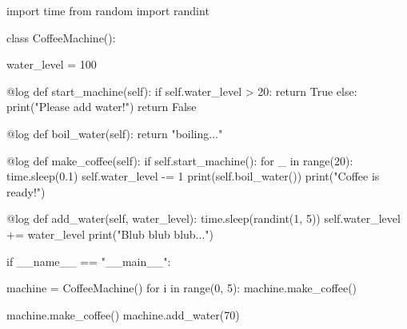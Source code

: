 \documentclass[]{article}
\newenvironment{Shaded}{\begin{snugshade}}{\end{snugshade}}
\newcommand{\AttributeTok}[1]{\textcolor[rgb]{0.16,0.50,0.73}{#1}}
\newcommand{\BuiltInTok}[1]{\textcolor[rgb]{0.50,0.55,0.55}{#1}}
\newcommand{\ControlFlowTok}[1]{\textcolor[rgb]{0.99,0.74,0.29}{#1}}
\newcommand{\DecValTok}[1]{\textcolor[rgb]{0.96,0.45,0.00}{#1}}
\newcommand{\FloatTok}[1]{\textcolor[rgb]{0.96,0.45,0.00}{#1}}
\newcommand{\ImportTok}[1]{\textcolor[rgb]{0.15,0.68,0.38}{#1}}
\newcommand{\KeywordTok}[1]{\textcolor[rgb]{0.81,0.81,0.76}{#1}}
\newcommand{\NormalTok}[1]{\textcolor[rgb]{0.81,0.81,0.76}{#1}}
\newcommand{\OperatorTok}[1]{\textcolor[rgb]{0.81,0.81,0.76}{#1}}
\newcommand{\StringTok}[1]{\textcolor[rgb]{0.96,0.31,0.31}{#1}}
\newcommand{\VariableTok}[1]{\textcolor[rgb]{0.15,0.68,0.68}{#1}}
\begin{document}
\begin{Shaded}
\begin{Highlighting}[]
\ImportTok{import}\NormalTok{ time}
\ImportTok{from}\NormalTok{ random }\ImportTok{import}\NormalTok{ randint}

\KeywordTok{class}\NormalTok{ CoffeeMachine():}

\NormalTok{    water_level }\OperatorTok{=} \DecValTok{100}

    \AttributeTok{@log}
    \KeywordTok{def}\NormalTok{ start_machine(}\VariableTok{self}\NormalTok{):}
      \ControlFlowTok{if} \VariableTok{self}\NormalTok{.water_level }\OperatorTok{>} \DecValTok{20}\NormalTok{:}
          \ControlFlowTok{return} \VariableTok{True}
      \ControlFlowTok{else}\NormalTok{:}
          \BuiltInTok{print}\NormalTok{(}\StringTok{"Please add water!"}\NormalTok{)}
          \ControlFlowTok{return} \VariableTok{False}
    
    \AttributeTok{@log}
    \KeywordTok{def}\NormalTok{ boil_water(}\VariableTok{self}\NormalTok{):}
        \ControlFlowTok{return} \StringTok{"boiling..."}
    
    \AttributeTok{@log}
    \KeywordTok{def}\NormalTok{ make_coffee(}\VariableTok{self}\NormalTok{):}
        \ControlFlowTok{if} \VariableTok{self}\NormalTok{.start_machine():}
            \ControlFlowTok{for}\NormalTok{ _ }\KeywordTok{in} \BuiltInTok{range}\NormalTok{(}\DecValTok{20}\NormalTok{):}
\NormalTok{                time.sleep(}\FloatTok{0.1}\NormalTok{)}
                \VariableTok{self}\NormalTok{.water_level }\OperatorTok{-=} \DecValTok{1}
            \BuiltInTok{print}\NormalTok{(}\VariableTok{self}\NormalTok{.boil_water())}
            \BuiltInTok{print}\NormalTok{(}\StringTok{"Coffee is ready!"}\NormalTok{)}
    
    \AttributeTok{@log}
    \KeywordTok{def}\NormalTok{ add_water(}\VariableTok{self}\NormalTok{, water_level):}
\NormalTok{        time.sleep(randint(}\DecValTok{1}\NormalTok{, }\DecValTok{5}\NormalTok{))}
        \VariableTok{self}\NormalTok{.water_level }\OperatorTok{+=}\NormalTok{ water_level}
        \BuiltInTok{print}\NormalTok{(}\StringTok{"Blub blub blub..."}\NormalTok{)}


\ControlFlowTok{if} \VariableTok{__name__} \OperatorTok{==} \StringTok{"__main__"}\NormalTok{:}
    
\NormalTok{    machine }\OperatorTok{=}\NormalTok{ CoffeeMachine()}
    \ControlFlowTok{for}\NormalTok{ i }\KeywordTok{in} \BuiltInTok{range}\NormalTok{(}\DecValTok{0}\NormalTok{, }\DecValTok{5}\NormalTok{):}
\NormalTok{        machine.make_coffee()}

\NormalTok{    machine.make_coffee()}
\NormalTok{    machine.add_water(}\DecValTok{70}\NormalTok{)}
\end{Highlighting}
\end{Shaded}
\end{document}
